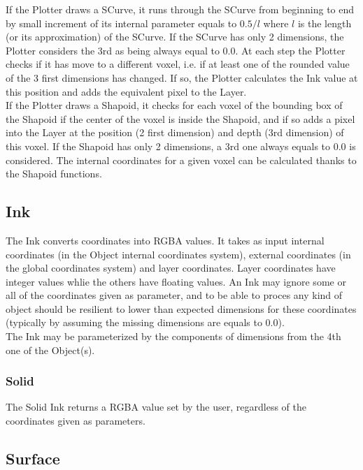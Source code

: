 If the Plotter draws a SCurve, it runs through the SCurve from beginning to end by small increment of its internal parameter equals to $0.5/l$ where $l$ is the length (or its approximation) of the SCurve. If the SCurve has only 2 dimensions, the Plotter considers the 3rd as being always equal to 0.0. At each step the Plotter checks if it has move to a different voxel, i.e. if at least one of the rounded value of the 3 first dimensions has changed. If so, the Plotter calculates the Ink value at this position and adds the equivalent pixel to the Layer.\\

If the Plotter draws a Shapoid, it checks for each voxel of the bounding box of the Shapoid if the center of the voxel is inside the Shapoid, and if so adds a pixel into the Layer at the position (2 first dimension) and depth (3rd dimension) of this voxel. If the Shapoid has only 2 dimensions, a 3rd one always equals to 0.0 is considered. The internal coordinates for a given voxel can be calculated thanks to the Shapoid functions.\\

\subsection{Ink}

The Ink converts coordinates into RGBA values. It takes as input internal coordinates (in the Object internal coordinates system), external coordinates (in the global coordinates system) and layer coordinates. Layer coordinates have integer values whlie the others have floating values. An Ink may ignore some or all of the coordinates given as parameter, and to be able to proces any kind of object should be resilient to lower than expected dimensions for these coordinates (typically by assuming the missing dimensions are equals to 0.0).\\

The Ink may be parameterized by the components of dimensions from the 4th one of the Object(s).\\

\subsubsection{Solid}

The Solid Ink returns a RGBA value set by the user, regardless of the coordinates given as parameters.

\subsection{Surface}

